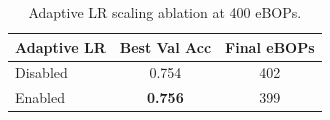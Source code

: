 \begin{table}[t]
\centering
\caption{Adaptive LR scaling ablation at 400 eBOPs.}
\label{tab:lr_ablation}
\begin{tabular}{lcc}
\toprule
Adaptive LR & Best Val Acc & Final eBOPs \\
\midrule
Disabled & 0.754 & 402 \\
Enabled & \textbf{0.756} & 399 \\
\bottomrule
\end{tabular}
\end{table}